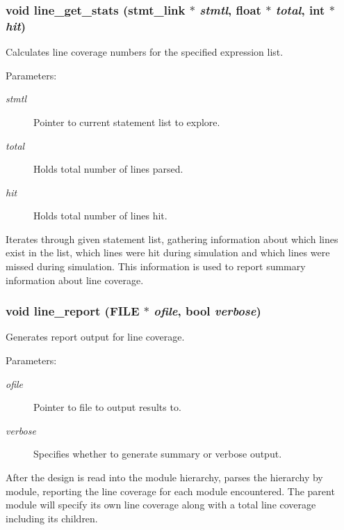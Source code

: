 \subsubsection{\setlength{\rightskip}{0pt plus 5cm}void line\_\-get\_\-stats ({\bf stmt\_\-link} $\ast$ {\em stmtl}, float $\ast$ {\em total}, int $\ast$ {\em hit})}\label{line_8h_a0}


Calculates line coverage numbers for the specified expression list.

\begin{Desc}
\item[Parameters:]
\begin{description}
\item[{\em stmtl}]Pointer to current statement list to explore. \item[{\em total}]Holds total number of lines parsed. \item[{\em hit}]Holds total number of lines hit.\end{description}
\end{Desc}
Iterates through given statement list, gathering information about which lines exist in the list, which lines were hit during simulation and which lines were missed during simulation. This information is used to report summary information about line coverage. 
\subsubsection{\setlength{\rightskip}{0pt plus 5cm}void line\_\-report (FILE $\ast$ {\em ofile}, {\bf bool} {\em verbose})}\label{line_8h_a1}


Generates report output for line coverage.

\begin{Desc}
\item[Parameters:]
\begin{description}
\item[{\em ofile}]Pointer to file to output results to. \item[{\em verbose}]Specifies whether to generate summary or verbose output.\end{description}
\end{Desc}
After the design is read into the module hierarchy, parses the hierarchy by module, reporting the line coverage for each module encountered. The parent module will specify its own line coverage along with a total line coverage including its children. 